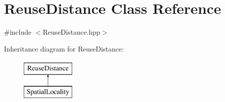 \hypertarget{class_reuse_distance}{
\section{ReuseDistance Class Reference}
\label{class_reuse_distance}
}


{\ttfamily \#include $<$ReuseDistance.hpp$>$}

Inheritance diagram for ReuseDistance:\begin{figure}[H]
\begin{center}
\leavevmode
\includegraphics[height=2cm]{class_reuse_distance}
\end{center}
\end{figure}
